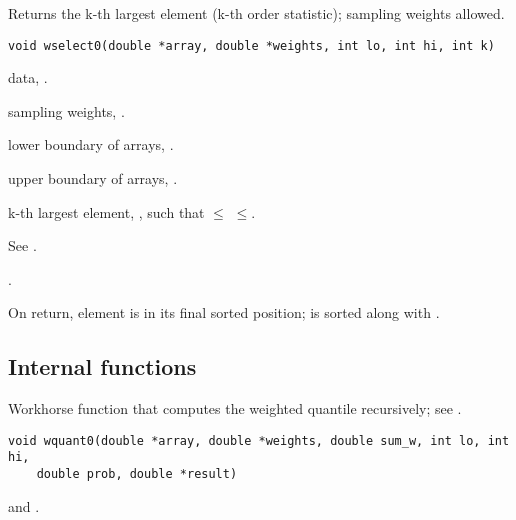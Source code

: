 \documentclass[a4paper,oneside,10pt,DIV=12]{scrreprt}
\begin{document}
\begin{Description}
Returns the k-th largest element (k-th order statistic); sampling weights 
allowed.
\end{Description}
\begin{Usage}
\begin{verbatim}
void wselect0(double *array, double *weights, int lo, int hi, int k)
\end{verbatim}
\end{Usage}
\begin{Arguments}
	\begin{ldescription}
		\item[\code{array}] data, . 

		\item[\code{weights}] sampling weights, . 

		\item[\code{lo}] lower boundary of arrays, . 

		\item[\code{hi}] upper boundary of arrays, .

		\item[\code{k}] k-th largest element, , such that 
			$\leq$ $\leq$. 
	\end{ldescription}
\end{Arguments}
\begin{Details}
See .
\end{Details}
\begin{Dependency}
	.
\end{Dependency}
\begin{Value}
	On return, element  is in its final sorted position; 
	 is sorted along with .
\end{Value}

\clearpage
\subsection*{Internal functions}
%

\begin{Description}
Workhorse function that computes the weighted quantile recursively; see 
.
\end{Description}
\begin{Usage}
\begin{verbatim}
void wquant0(double *array, double *weights, double sum_w, int lo, int hi,
    double prob, double *result)
\end{verbatim}
\end{Usage}
\begin{Dependencies}
	 and 
	.
\end{Dependencies}
\end{document}
